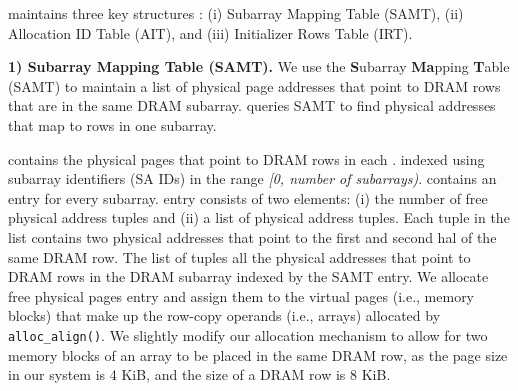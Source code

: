 
\iffalse
\begin{figure}[!ht]
  \centering
  \texttt{[image: figures/SAMT.pdf]}
  \caption{Organization of the subarray mapping table. Each physical address in a tuple in the list addresses one half of a DRAM row}
  \label{fig:SAMT}
\end{figure}
\fi

{ maintains three key structures : (i) Subarray Mapping Table (SAMT), (ii) Allocation ID Table (AIT), and (iii) Initializer Rows Table (IRT).}

\noindent
\textbf{{1) Subarray Mapping Table (SAMT).}} We use the \textbf{S}ubarray \textbf{Ma}pping \textbf{T}able (SAMT) to maintain a list of physical page addresses that point to DRAM rows that are in the same DRAM subarray. { queries SAMT to find physical addresses that map to rows in one subarray.} 

 contains the physical pages that point to DRAM rows in each .  indexed using subarray identifiers (SA IDs) in the range \emph{[0, number of subarrays)}.  contains an entry for every subarray.  entry consists of two elements: (i) the number of free physical address tuples and (ii) a list of physical address tuples. Each tuple in the list contains two physical addresses that  point to the first and second hal of the same DRAM row. The list of tuples  all the physical addresses that point to DRAM rows in the DRAM subarray indexed by the SAMT entry. We allocate free physical pages  entry and assign them to the virtual pages (i.e., memory blocks) that make up the {row-copy operands (i.e., arrays)} allocated by \texttt{alloc\_align()}. We slightly modify our  allocation mechanism to allow for two memory blocks  of an array to be placed in the same DRAM row, as the page size in our system is 4 KiB, and the size of a DRAM row is 8 KiB. 



